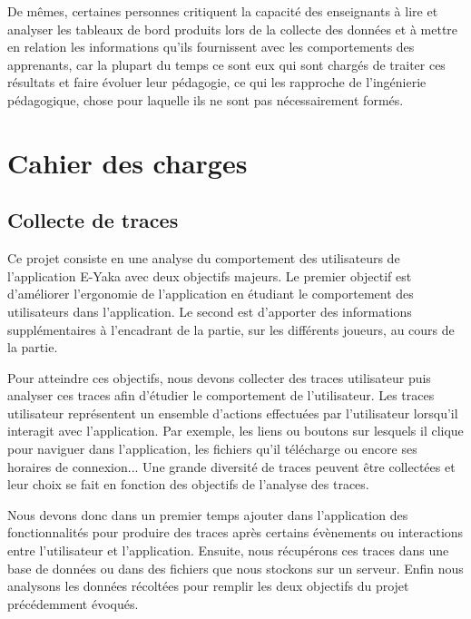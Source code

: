            De mêmes, certaines personnes critiquent la capacité des enseignants à lire et analyser les tableaux de bord produits lors de la collecte des données et à mettre en relation les informations qu’ils fournissent avec les comportements des apprenants, car la plupart du temps ce sont eux qui sont chargés de traiter ces résultats et faire évoluer leur pédagogie, ce qui les rapproche de l’ingénierie pédagogique, chose pour laquelle ils ne sont pas nécessairement formés.
        
       


    \section{Cahier des charges  }

        \subsection{Collecte de traces}
            
            Ce projet consiste en une analyse du comportement des utilisateurs de l’application E-Yaka avec deux objectifs majeurs. Le premier objectif est d’améliorer l’ergonomie de l’application en étudiant le comportement des utilisateurs dans l’application. Le second est d’apporter des informations supplémentaires à l’encadrant de la partie, sur les différents joueurs, au cours de la partie.
            
            Pour atteindre ces objectifs, nous devons collecter des traces utilisateur puis analyser ces traces afin d’étudier le comportement de l’utilisateur. Les traces utilisateur représentent un ensemble d’actions effectuées par l’utilisateur lorsqu’il interagit avec l’application. Par exemple, les liens ou boutons sur lesquels il clique pour naviguer dans l’application, les fichiers qu’il télécharge ou encore ses horaires de connexion... Une grande diversité de traces peuvent être collectées et leur choix se fait en fonction des objectifs de l’analyse des traces.
            
            Nous devons donc dans un premier temps ajouter dans l’application des fonctionnalités pour produire des traces après certains évènements ou interactions entre l’utilisateur et l’application. Ensuite, nous récupérons ces traces dans une base de données ou dans des fichiers que nous stockons sur un serveur. Enfin nous analysons les données récoltées pour remplir les deux objectifs du projet précédemment évoqués.
            
